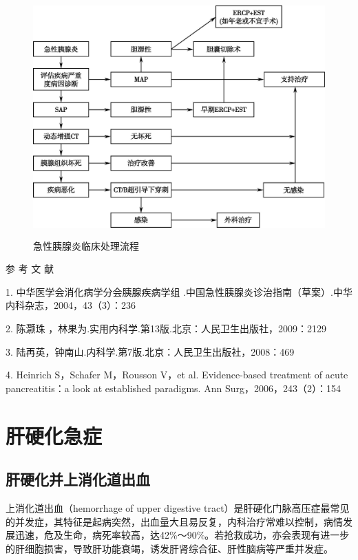 \begin{figure}[!htbp]
 \centering
 \includegraphics[width=4.75in,height=3.61458in]{./images/Image00488.jpg}
 \captionsetup{justification=centering}
 \caption{急性胰腺炎临床处理流程}
 \label{fig115-1}
  \end{figure} \protect\hypertarget{text00327.html}{}{}

\hypertarget{text00327.htmlux5cux23CHP11-6-4}{}
参 考 文 献

1. 中华医学会消化病学分会胰腺疾病学组
.中国急性胰腺炎诊治指南（草案）.中华内科杂志，2004，43（3）：236

2. 陈灏珠 ，林果为.实用内科学.第13版.北京：人民卫生出版社，2009：2129

3. 陆再英，钟南山.内科学.第7版.北京：人民卫生出版社，2008：469

4. Heinrich S，Schafer M，Rousson V，et al. Evidence-based treatment of
acute pancreatitis：a look at established paradigms. Ann
Surg，2006，243（2）：154

\protect\hypertarget{text00328.html}{}{}

\chapter{肝硬化急症}

\section{肝硬化并上消化道出血}

上消化道出血（hemorrhage of upper digestive
tract）是肝硬化门脉高压症最常见的并发症，其特征是起病突然，出血量大且易反复，内科治疗常难以控制，病情发展迅速，危及生命，病死率较高，达42\%～90\%。若抢救成功，亦会表现有进一步的肝细胞损害，导致肝功能衰竭，诱发肝肾综合征、肝性脑病等严重并发症。

